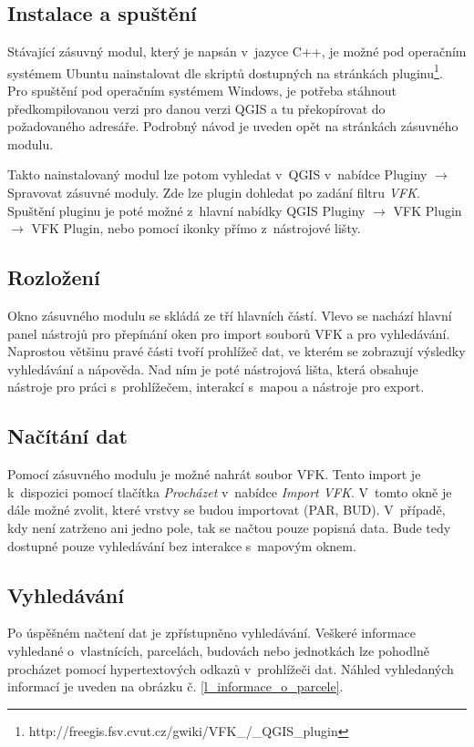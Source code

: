 \documentclass[a4paper,12pt,oneside]{book}
\begin{document}
\subsection{Instalace a spuštění}
Stávající zásuvný modul, který je napsán v~jazyce C++, je možné pod operačním systémem Ubuntu nainstalovat dle skriptů dostupných na stránkách pluginu\footnote{http://freegis.fsv.cvut.cz/gwiki/VFK\_/\_QGIS\_plugin}. Pro spuštění pod operačním systémem Windows, je potřeba stáhnout předkompilovanou verzi pro danou verzi QGIS a tu překopírovat do požadovaného adresáře. Podrobný návod je uveden opět na stránkách zásuvného modulu. 

Takto nainstalovaný modul lze potom vyhledat v~QGIS v~nabídce Pluginy $\rightarrow$ Spravovat zásuvné moduly. Zde lze plugin dohledat po zadání filtru \textit{VFK}. Spuštění pluginu je poté možné z~hlavní nabídky QGIS Pluginy $\rightarrow$ VFK Plugin $\rightarrow$ VFK Plugin, nebo pomocí ikonky přímo z~nástrojové lišty.

\subsection{Rozložení}
Okno zásuvného modulu se skládá ze tří hlavních částí. Vlevo se nachází hlavní panel nástrojů pro přepínání oken pro import souborů VFK a pro vyhledávání. Naprostou většinu pravé části tvoří prohlížeč dat, ve kterém se zobrazují výsledky vyhledávání a nápověda. Nad ním je poté nástrojová lišta, která obsahuje nástroje pro práci s~prohlížečem, interakcí s~mapou a nástroje pro export. 

\subsection{Načítání dat}
Pomocí zásuvného modulu je možné nahrát soubor VFK. Tento import je k~dispozici pomocí tlačítka \textit{Procházet} v~nabídce \textit{Import VFK}. V~tomto okně je dále možné zvolit, které vrstvy se budou importovat (PAR, BUD). V~případě, kdy není zatrženo ani jedno pole, tak se načtou pouze popisná data. Bude tedy dostupné pouze vyhledávání bez interakce s~mapovým oknem. 

\subsection{Vyhledávání}
Po úspěšném načtení dat je zpřístupněno vyhledávání. Veškeré informace vyhledané o~vlastnících, parcelách, budovách nebo jednotkách lze pohodlně procházet pomocí hypertextových odkazů v~prohlížeči dat. Náhled vyhledaných informací je uveden na obrázku č. \ref{l_informace_o_parcele}.
\end{document}
